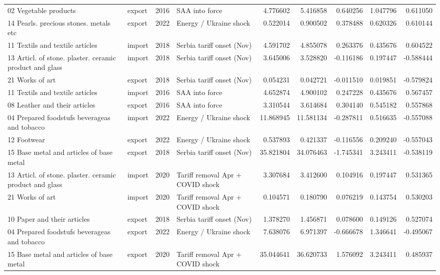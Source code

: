 \begin{tabular}{llrlrrrrr}
02 Vegetable products & export & 2016 & SAA into force & 4.776602 & 5.416858 & 0.640256 & 1.047796 & 0.611050 \\
14 Pearls. precious stones. metals etc & export & 2022 & Energy / Ukraine shock & 0.522014 & 0.900502 & 0.378488 & 0.620326 & 0.610144 \\
11 Textils and textile articles & import & 2018 & Serbia tariff onset (Nov) & 4.591702 & 4.855078 & 0.263376 & 0.435676 & 0.604522 \\
13 Articl. of stone. plaster. ceramic product and glass & import & 2018 & Serbia tariff onset (Nov) & 3.645006 & 3.528820 & -0.116186 & 0.197447 & -0.588444 \\
21 Works of art & export & 2018 & Serbia tariff onset (Nov) & 0.054231 & 0.042721 & -0.011510 & 0.019851 & -0.579824 \\
11 Textils and textile articles & import & 2016 & SAA into force & 4.652874 & 4.900102 & 0.247228 & 0.435676 & 0.567457 \\
08 Leather and their articles & export & 2016 & SAA into force & 3.310544 & 3.614684 & 0.304140 & 0.545182 & 0.557868 \\
04 Prepared foodstufs beverageas and tobacco & import & 2022 & Energy / Ukraine shock & 11.868945 & 11.581134 & -0.287811 & 0.516635 & -0.557088 \\
12 Footwear & export & 2022 & Energy / Ukraine shock & 0.537893 & 0.421337 & -0.116556 & 0.209240 & -0.557043 \\
15 Base metal and articles of base metal & export & 2018 & Serbia tariff onset (Nov) & 35.821804 & 34.076463 & -1.745341 & 3.243411 & -0.538119 \\
13 Articl. of stone. plaster. ceramic product and glass & import & 2020 & Tariff removal Apr + COVID shock & 3.307684 & 3.412600 & 0.104916 & 0.197447 & 0.531365 \\
21 Works of art & import & 2020 & Tariff removal Apr + COVID shock & 0.104571 & 0.180790 & 0.076219 & 0.143754 & 0.530203 \\
10 Paper and their articles & export & 2018 & Serbia tariff onset (Nov) & 1.378270 & 1.456871 & 0.078600 & 0.149126 & 0.527074 \\
04 Prepared foodstufs beverageas and tobacco & export & 2022 & Energy / Ukraine shock & 7.638076 & 6.971397 & -0.666678 & 1.346641 & -0.495067 \\
15 Base metal and articles of base metal & export & 2020 & Tariff removal Apr + COVID shock & 35.044641 & 36.620733 & 1.576092 & 3.243411 & 0.485937 \\

\end{tabular}
